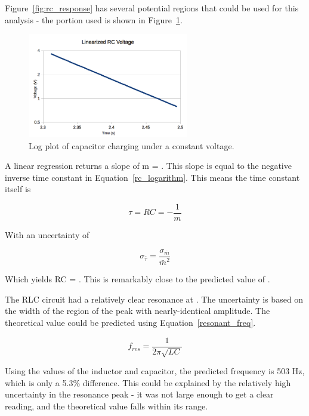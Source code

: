 \documentclass[journal]{IEEEtran}
\begin{document}
Figure~\ref{fig:rc_response} has several potential regions that could be used
for this analysis - the portion used is shown in Figure~\ref{fig:rc_linear}.

\begin{figure}[ht!]
\centering
\includegraphics[width=70mm]{rc_linear.png}
\caption{Log plot of capacitor charging under a constant voltage.}
\label{fig:rc_linear}
\end{figure}

A linear regression returns a slope of m = . This slope is
equal to the negative inverse time constant in Equation~\ref{rc_logarithm}.
This means the time constant itself is

\begin{displaymath}
\tau = RC = -\frac{1}{m}
\end{displaymath} 

With an uncertainty of

\begin{displaymath}
\sigma _{\bar \tau} = \frac{\sigma _{\bar m}}{\bar m^2}
\end{displaymath} 

Which yields RC = . This is remarkably close to the
predicted value of . 

The RLC circuit had a relatively clear resonance at . The
uncertainty is based on the width of the region of the peak with
nearly-identical amplitude. The theoretical value could be predicted using
Equation~\ref{resonant_freq}.

\begin{equation}
\label{resonant_freq}
f_{res} = \frac{1}{2 \pi \sqrt{LC}}
\end{equation}

Using the values of the inductor and capacitor, the predicted frequency is 503
Hz, which is only a 5.3\% difference. This could be explained by the relatively
high uncertainty in the resonance peak - it was not large enough to get a clear
reading, and the theoretical value falls within its range.
\end{document}
